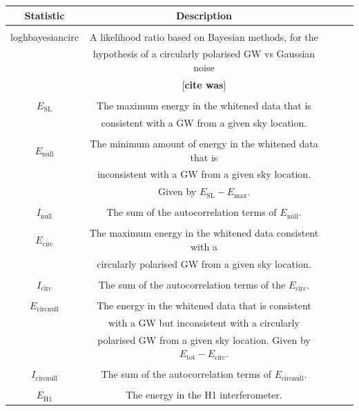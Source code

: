 \documentclass[11pt]{cuthesis}
\begin{document}
 \begin{table} \label{tab:labels}
\begin{tabular}{| c | c | c | c | c |} 
 \hline
\textbf{Statistic }& \textbf{Description}  \\ [0.5ex] 
 \hline\hline
& \\ 
loghbayesiancirc & A likelihood ratio based on Bayesian methods, for the \\ & hypothesis of a circularly polarised GW vs Gaussian noise\\ & [\textbf{cite was}]  \\

\hline
& \\
$E_\text{SL}$ & The maximum energy in the whitened data that is \\ & consistent with a GW from a given sky location. \\

\hline
& \\
$E_\text{null}$& The minimum amount of energy in the whitened data that is\\ & inconsistent with a GW from a given sky location. \\ & Given by $E_\text{SL}-E_\text{max}$. \\
\hline
& \\
$I_\text{null}$& The sum of the autocorrelation terms of $E_\text{null}$. \\

\hline
& \\
$E_\text{circ}$ & The maximum energy in the whitened data consistent with a\\ & circularly polarised GW from a given sky location.  \\
\hline
& \\
$I_\text{circ}$ & The sum of the autocorrelation terms of the $E_\text{circ}$. \\

\hline
& \\
$E_\text{circnull}$ & The energy in the whitened data that is consistent \\ & with a GW but inconsistent with a circularly \\ & polarised GW from a given sky location. Given by $E_\text{tot}-E_\text{circ}$. \\

\hline
& \\
$I_\text{circnull}$& The sum of the autocorrelation terms of $E_\text{circnull}$.  \\
\hline
& \\
$E_\text{H1}$& The energy in the H1 interferometer. \\


\end{tabular}
\end{table}
\end{document}

